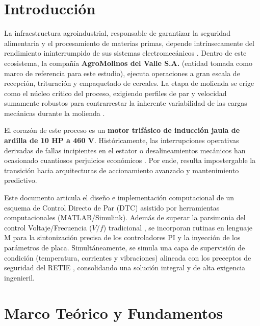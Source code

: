\documentclass[conference]{IEEEtran}
\begin{document}
\section{Introducción}
La infraestructura agroindustrial, responsable de garantizar la seguridad alimentaria y el procesamiento de materias primas, depende intrínsecamente del rendimiento ininterrumpido de sus sistemas electromecánicos \cite{moubray1997}. Dentro de este ecosistema, la compañía \textbf{AgroMolinos del Valle S.A.} (entidad tomada como marco de referencia para este estudio), ejecuta operaciones a gran escala de recepción, trituración y empaquetado de cereales. La etapa de molienda se erige como el núcleo crítico del proceso, exigiendo perfiles de par y velocidad sumamente robustos para contrarrestar la inherente variabilidad de las cargas mecánicas durante la molienda \cite{nandi2005}.

El corazón de este proceso es un \textbf{motor trifásico de inducción jaula de ardilla de 10 HP a 460 V}. Históricamente, las interrupciones operativas derivadas de fallas incipientes en el estator o desalineamientos mecánicos han ocasionado cuantiosos perjuicios económicos \cite{gao2015}. Por ende, resulta impostergable la transición hacia arquitecturas de accionamiento avanzado y mantenimiento predictivo.

Este documento articula el diseño e implementación computacional de un esquema de Control Directo de Par (DTC) asistido por herramientas computacionales (MATLAB/Simulink). Además de superar la parsimonia del control Voltaje/Frecuencia ($V/f$) tradicional \cite{bose2006}, se incorporan rutinas en lenguaje M para la sintonización precisa de los controladores PI y la inyección de los parámetros de placa. Simultáneamente, se simula una capa de supervisión de condición (temperatura, corrientes y vibraciones) alineada con los preceptos de seguridad del RETIE \cite{retie2013}, consolidando una solución integral y de alta exigencia ingenieril.

\section{Marco Teórico y Fundamentos}
\end{document}
